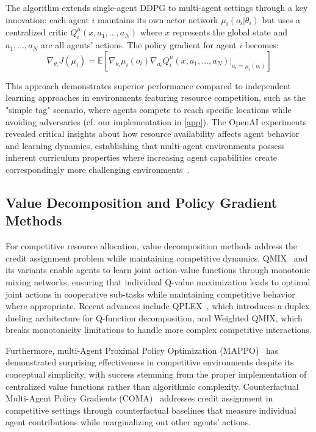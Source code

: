 The algorithm extends single-agent DDPG to multi-agent settings through a key innovation: each agent $i$ maintains its own actor network $\mu_i(o_i|\theta_i)$ but uses a centralized critic $Q_i^\mu(x, a_1, \ldots, a_N)$ where $x$ represents the global state and $a_1, \ldots, a_N$ are all agents' actions. The policy gradient for agent $i$ becomes:
\begin{equation}
    \nabla_{\theta_i} J(\mu_i) = \mathbb{E}[\nabla_{\theta_i} \mu_i(o_i) \nabla_{a_i} Q_i^\mu(x, a_1, \ldots, a_N)|_{a_i=\mu_i(o_i)}]
\end{equation}

This approach demonstrates superior performance compared to independent learning approaches in environments featuring resource competition, such as the "simple tag" scenario, where agents compete to reach specific locations while avoiding adversaries (cf. our implementation in \ref{app}). The OpenAI experiments revealed critical insights about how resource availability affects agent behavior and learning dynamics, establishing that multi-agent environments possess inherent curriculum properties where increasing agent capabilities create correspondingly more challenging environments~\autocite{lowe_learning_2017}.

\subsection{Value Decomposition and Policy Gradient Methods}

For competitive resource allocation, value decomposition methods address the credit assignment problem while maintaining competitive dynamics. QMIX~\autocite{rashid_monotonic_2020} and its variants enable agents to learn joint action-value functions through monotonic mixing networks, ensuring that individual Q-value maximization leads to optimal joint actions in cooperative sub-tasks while maintaining competitive behavior where appropriate. Recent advances include QPLEX~\autocite{wang_qplex_2021}, which introduces a duplex dueling architecture for Q-function decomposition, and Weighted QMIX, which breaks monotonicity limitations to handle more complex competitive interactions.

Furthermore, multi-Agent Proximal Policy Optimization (MAPPO)~\autocite{yu_surprising_2022} has demonstrated surprising effectiveness in competitive environments despite its conceptual simplicity, with success stemming from the proper implementation of centralized value functions rather than algorithmic complexity. Counterfactual Multi-Agent Policy Gradients (COMA)~\autocite{foerster_counterfactual_2018} addresses credit assignment in competitive settings through counterfactual baselines that measure individual agent contributions while marginalizing out other agents' actions.

